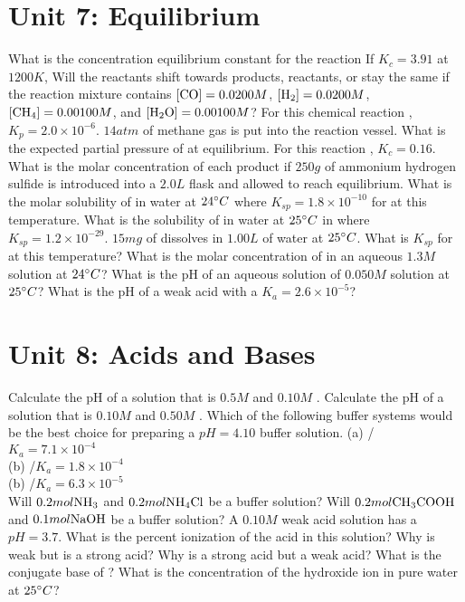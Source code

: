 \documentclass[../main.tex]{subfiles}
\begin{document}
\section{Unit 7: Equilibrium}
\ProblemSet
What is the concentration equilibrium constant for the reaction 
\ProblemSet
If \(K_c = 3.91\) at \(1200K\), Will the reactants shift towards products, reactants, or stay the same if the reaction mixture contains \([\ce{CO}] = 0.0200M\), \([\ce{H2}] = 0.0200M\), \([\ce{CH4}] = 0.00100M\), and \([\ce{H2O}] = 0.00100M\)?
\ProblemSet 
For this chemical reaction , \(K_p = 2.0\times 10^{-6}\). \(14 atm\) of methane gas is put into the reaction vessel. What is the expected partial pressure of  at equilibrium. 
\ProblemSet
For this reaction , \(K_c = 0.16\). What is the molar concentration of each product if \(250g\) of ammonium hydrogen sulfide is introduced into a \(2.0L\) flask and allowed to reach equilibrium. 
\ProblemSet
What is the molar solubility of  in water at \(24\degree C\) where \(K_{sp} = 1.8 \times 10^{-10}\) for  at this temperature.
\ProblemSet 
What is the solubility of  in water at \(25\degree C\) in where \(K_{sp} = 1.2\times 10^{-29}\). 
\ProblemSet
\(15mg\) of  dissolves in \(1.00L\) of water at \(25\degree C\). What is \(K_{sp}\) for  at this temperature?
\ProblemSet 
What is the molar concentration of  in an aqueous \(1.3M\)  solution at \(24\degree C\)?
\ProblemSet
What is the pH of an aqueous solution of \(0.050M\)  solution at \(25\degree C\)?
\ProblemSet
What is the pH of a weak acid with a \(K_a = 2.6\times 10^{-5}\)? 
\section{Unit 8: Acids and Bases}
\ProblemSet
Calculate the pH of  a solution that is \(0.5M\)  and \(0.10M\) .
\ProblemSet
Calculate the pH of a solution that is \(0.10M\)  and \(0.50M\) .
\ProblemSet
Which of the following buffer systems would be the best choice for preparing a \(pH = 4.10\) buffer solution. 
(a) / \hspace{1em} \(K_a = 7.1\times 10^{-4}\) \\
(b) /\hspace{1em}\(K_a = 1.8\times 10^{-4}\)\\
(b) /\hspace{1em}\(K_a = 6.3\times 10^{-5}\)\\
\ProblemSet
Will \(0.2mol\ce{NH3}\) and \(0.2mol\ce{NH4Cl}\) be a buffer solution? 
\ProblemSet
Will \(0.2mol\ce{CH3COOH}\) and \(0.1mol\ce{NaOH}\) be a buffer solution?
\ProblemSet
A \(0.10M\) weak acid solution has a \(pH = 3.7\). What is the percent ionization of the acid in this solution? 
\ProblemSet
Why is  weak but  is  a strong acid?
\ProblemSet
Why is  a strong acid but  a weak acid? 
\ProblemSet
What is the conjugate base of ?
\ProblemSet
What is the concentration of the hydroxide ion in pure water at \(25\degree C\)?
\end{document}
